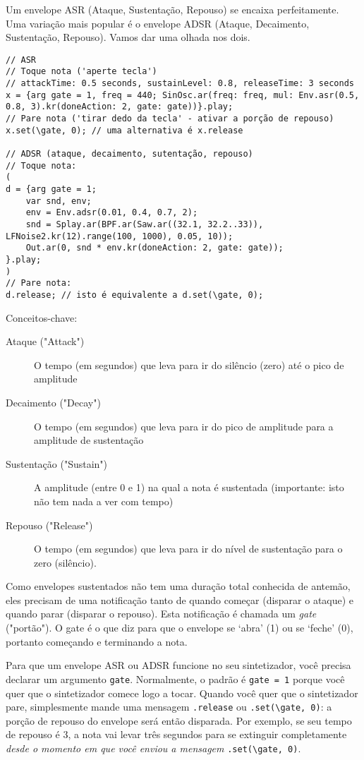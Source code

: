 Um envelope ASR (Ataque, Sustentação, Repouso) se encaixa perfeitamente. Uma variação mais popular é o envelope ADSR (Ataque, Decaimento, Sustentação, Repouso). Vamos dar uma olhada nos dois.

 
\begin{lstlisting}[style=SuperCollider-IDE, basicstyle=\scttfamily\footnotesize]
// ASR
// Toque nota ('aperte tecla')
// attackTime: 0.5 seconds, sustainLevel: 0.8, releaseTime: 3 seconds
x = {arg gate = 1, freq = 440; SinOsc.ar(freq: freq, mul: Env.asr(0.5, 0.8, 3).kr(doneAction: 2, gate: gate))}.play;
// Pare nota ('tirar dedo da tecla' - ativar a porção de repouso)
x.set(\gate, 0); // uma alternativa é x.release

// ADSR (ataque, decaimento, sutentação, repouso)
// Toque nota:
(
d = {arg gate = 1;
	var snd, env;
	env = Env.adsr(0.01, 0.4, 0.7, 2);
	snd = Splay.ar(BPF.ar(Saw.ar((32.1, 32.2..33)), LFNoise2.kr(12).range(100, 1000), 0.05, 10));
	Out.ar(0, snd * env.kr(doneAction: 2, gate: gate));
}.play;
)
// Pare nota:
d.release; // isto é equivalente a d.set(\gate, 0);
\end{lstlisting}
 
Conceitos-chave:

\begin{description}
\item[Ataque ("Attack")] O tempo (em segundos) que leva para ir do silêncio (zero) até o pico de amplitude
\item[Decaimento ("Decay")] O tempo (em segundos) que leva para ir do pico de amplitude para a amplitude de sustentação
\item[Sustentação ("Sustain")] A amplitude (entre 0 e 1) na qual a nota é sustentada (importante: isto não tem nada a ver com tempo)
\item[Repouso ("Release")] O tempo (em segundos) que leva para ir do nível de sustentação para o zero (silêncio).
\end{description}

Como envelopes sustentados não tem uma duração total conhecida de antemão, eles precisam de uma notificação tanto de quando começar (disparar o ataque) e quando parar (disparar o repouso). Esta notificação é chamada um \emph{gate} ("portão"). O gate é o que diz para que o envelope se ‘abra’ (1) ou se ‘feche’ (0), portanto começando e terminando a nota.

Para que um envelope ASR ou ADSR funcione no seu sintetizador, você precisa declarar um argumento \texttt{gate}. Normalmente, o padrão é \texttt{gate = 1} porque você quer que o sintetizador comece logo a tocar. Quando você quer que o sintetizador pare, simplesmente mande uma mensagem \texttt{.release} ou \texttt{.set(\textbackslash gate, 0)}: a porção de repouso do envelope será então disparada. Por exemplo, se seu tempo de repouso é 3, a nota vai levar três segundos para se extinguir completamente \emph{desde o momento em que você enviou a mensagem} \texttt{.set(\textbackslash gate, 0)}. 

